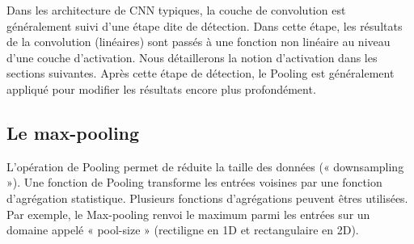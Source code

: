 % 


Dans les architecture de CNN typiques, la couche de convolution est généralement suivi d'une étape dite de détection. Dans cette étape, les résultats de la convolution (linéaires) sont passés à une fonction non linéaire au niveau d'une couche d'activation. Nous détaillerons la notion d'activation dans les sections suivantes. Après cette étape de détection, le Pooling est généralement appliqué pour modifier les résultats encore plus profondément.

\subsection{Le max-pooling}
\label{subsec:MaxPoling}
L'opération de Pooling permet de réduite la taille des données (« downsampling »). Une fonction de Pooling transforme les entrées voisines par une fonction d'agrégation statistique. Plusieurs fonctions d'agrégations peuvent êtres utilisées. Par exemple, le Max-pooling renvoi le maximum parmi les entrées sur un domaine appelé « pool-size » (rectiligne en 1D et rectangulaire en 2D). 


